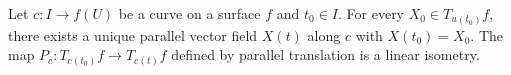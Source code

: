 Let $c: I \to f(U)$ be a curve on a surface $f$ and $t_0 \in I$. For every $X_0 \in T_{u(t_0)}f$, there exists a unique parallel vector field $X(t)$ along $c$ with $X(t_0) = X_0$. The map $P_c: T_{c(t_0)}f \to T_{c(t)}f$ defined by parallel translation is a linear isometry.